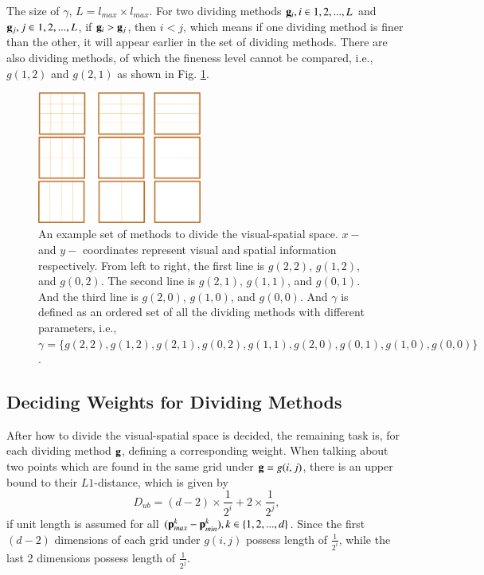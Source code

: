 \documentclass[paper]{ieice}
\begin{document}
The size of $\gamma$, $L=l_{max} \times l_{max}$. For two dividing methods ${\bf g}_i,i \in {1,2,...,L}$ and ${\bf g}_j,j \in {1,2,...,L}$, if ${\bf g}_i>{\bf g}_j$, then $i<j$, which means if one dividing method is finer than the other, it will appear earlier in the set of dividing methods. There are also dividing methods, of which the fineness level cannot be compared, i.e., $g(1,2)$ and $g(2,1)$ as shown in Fig. \ref{fig:p3}.


\begin{figure}
\centering
\includegraphics[width=0.48\textwidth]{pms3.eps}
\caption[Visual-spatial space dividing]{An example set of methods to divide the visual-spatial space. $x-$ and $y-$ coordinates represent visual and spatial information respectively. From left to right, the first line is $g(2,2)$, $g(1,2)$, and $g(0,2)$. The second line is $g(2,1)$, $g(1,1)$, and $g(0,1)$. And the third line is $g(2,0)$, $g(1,0)$, and $g(0,0)$. And $\gamma$ is defined as an ordered set of all the dividing methods with different parameters, i.e., $\gamma=\{g(2,2),g(1,2),g(2,1),g(0,2),g(1,1),g(2,0),g(0,1),g(1,0),g(0,0)\}$.}
\label{fig:p3}
\end{figure}



\subsection{Deciding Weights for Dividing Methods}
After how to divide the visual-spatial space is decided, the remaining task is, for each dividing method $\bf g$, defining a corresponding weight.
When talking about two points which are found in the same grid under ${\bf g}=g(i,j)$, there is an upper bound to their $L1$-distance, which is given by
\[D_{ub}=  {(d-2)\times \frac 1 {2^i} +2\times \frac 1 {2^j} } ,
\]
 if unit length is assumed for all $({\bf p}_{max}^k - {\bf p}_{min}^k ),k \in \{1,2,...,d\}$. Since the first $(d-2)$ dimensions of each grid under $g(i,j)$ possess length of $\frac 1 {2^i}$, while the last 2 dimensions possess length of  $\frac 1 {2^j}$.
\end{document}
